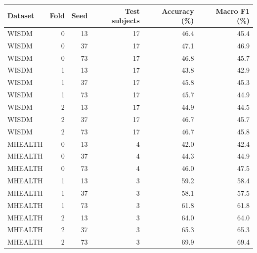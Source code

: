 \begin{tabular}{lrrrrr}
\toprule
Dataset & Fold & Seed & Test subjects & Accuracy (\%) & Macro F1 (\%) \\
\midrule
WISDM & 0 & 13 & 17 & 46.4 & 45.4 \\
WISDM & 0 & 37 & 17 & 47.1 & 46.9 \\
WISDM & 0 & 73 & 17 & 46.8 & 45.7 \\
WISDM & 1 & 13 & 17 & 43.8 & 42.9 \\
WISDM & 1 & 37 & 17 & 45.8 & 45.3 \\
WISDM & 1 & 73 & 17 & 45.7 & 44.9 \\
WISDM & 2 & 13 & 17 & 44.9 & 44.5 \\
WISDM & 2 & 37 & 17 & 46.7 & 45.7 \\
WISDM & 2 & 73 & 17 & 46.7 & 45.8 \\
MHEALTH & 0 & 13 & 4 & 42.0 & 42.4 \\
MHEALTH & 0 & 37 & 4 & 44.3 & 44.9 \\
MHEALTH & 0 & 73 & 4 & 46.0 & 47.5 \\
MHEALTH & 1 & 13 & 3 & 59.2 & 58.4 \\
MHEALTH & 1 & 37 & 3 & 58.1 & 57.5 \\
MHEALTH & 1 & 73 & 3 & 61.8 & 61.8 \\
MHEALTH & 2 & 13 & 3 & 64.0 & 64.0 \\
MHEALTH & 2 & 37 & 3 & 65.3 & 65.3 \\
MHEALTH & 2 & 73 & 3 & 69.9 & 69.4 \\
\bottomrule
\end{tabular}
